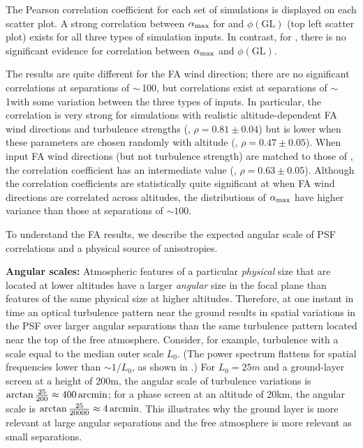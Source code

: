 \documentclass[twocolumn,twocolappendix]{openjournal}
\begin{document}
The Pearson correlation coefficient for each set of simulations is displayed on each scatter plot. 
A strong correlation between $\alpha_{\rm max}$ for \largesep and $\phi(\text{GL})$ (top left scatter plot) exists for all three types of simulation inputs. 
In contrast, for \smallsep, there is no significant evidence for correlation between $\alpha_{\rm max}$ and $\phi(\text{GL})$.

The results are quite different for the FA wind direction; there are no significant correlations at separations of $\sim\,$100\amin, but correlations exist at separations of $\sim\,$1\amin with some variation between the three types of inputs.
In particular, the correlation is very strong for simulations with realistic altitude-dependent FA wind directions and turbulence strengths (\psfwssims, $\rho=0.81\pm0.04$) but is lower when these parameters are chosen randomly with altitude (\bench, $\rho=0.47\pm0.05$). 
When input FA wind directions (but not turbulence strength) are matched to those of \psfwssims, the correlation coefficient has an intermediate value (\match, $\rho=0.63\pm0.05$). 
Although the correlation coefficients are statistically quite significant at \smallsep when FA wind directions are correlated across altitudes, the distributions of $\alpha_{\rm max}$ have higher variance than those at separations of $\sim100$\amin.  

To understand the FA results, we describe the expected angular scale of PSF correlations and a physical source of anisotropies. 

{\bf Angular scales:}
Atmospheric features of a particular \textit{physical} size that are located at lower altitudes have a larger \textit{angular} size in the focal plane than features of the same physical size at higher altitudes. 
Therefore, at one instant in time an optical turbulence pattern near the ground results in spatial variations in the PSF over larger angular separations than the same turbulence pattern located near the top of the free atmosphere. 
Consider, for example,  turbulence with a scale equal to the median outer scale $L_0$. 
(The power spectrum flattens for spatial frequencies lower than $\sim 1/L_0$, as shown in .) 
For $L_0 = 25\unit{m}$ and a ground-layer screen at a height of  200\unit{m}, the angular scale of turbulence variations is $\arctan\frac{25}{200}\approx 400\mathrm{\,arcmin}$; 
for a phase screen at an altitude of 20\unit{km}, the angular scale is $\arctan\frac{25}{20000}\approx 4\mathrm{\,arcmin}$.
This illustrates why the ground layer is more relevant at large angular separations and the free atmosphere is more relevant as small separations.
\end{document}
